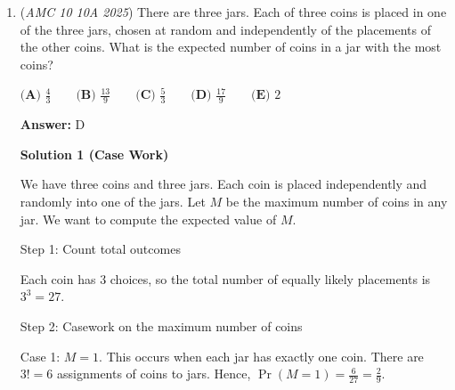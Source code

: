 \begin{enumerate}
 Hence, $t = \frac{40}{50} = \frac{4}{5}$ or $t = \frac{30}{50} = \frac{3}{5}$

 Since $\frac{4}{5}$ and $\frac{3}{5}$ are both valid values for $\cos \theta$ in this case, we need to determine which one to choose.

 We notice that $\theta$ represents the greater angle in $\triangle ABC$, hence, it would correspond to a smaller value of $\cos \theta$ (according to the unit circle). Hence, $\cos \theta = \frac{3}{5}$.

 Plugging the value into the equation $\sin^2 \theta + \cos^2 \theta = 1$:

 
 \[\sin^2 \theta + (\frac{3}{5})^2 = 1\]
 \[\sin^2 \theta + \frac{9}{25} = 1\]
 \[\sin^2 \theta = \frac{16}{25}\]
 \[\sin \theta = \frac{4}{5}\] (It must be positive, because the angle is acute)

 Then, we have:

 
 \[BC = \frac{\cos \theta}{\sin \theta} = \frac{\frac{3}{5}}{\frac{4}{5}} = \frac{3}{5} \cdot \frac{5}{4} = \frac{3}{4}\]

 Hence, $\triangle ABC = \frac{1}{2} \cdot \frac{3}{4} = \boxed{\textbf{(A)} \frac{3}{8}}$.

 


	\item (\textit{AMC 10 10A 2025}) There are three jars. Each of three coins is placed in one of the three jars, chosen at random and independently of the placements of the other coins. What is the expected number of coins in a jar with the most coins?


 $\textbf{(A) } \frac{4}{3} \qquad\textbf{(B) } \frac{13}{9} \qquad\textbf{(C) } \frac{5}{3} \qquad\textbf{(D) } \frac{17}{9} \qquad\textbf{(E) } 2$

 \textbf{Answer: }D



\textbf{Solution 1 (Case Work)}

We have three coins and three jars. Each coin is placed independently and randomly into one of the jars. Let $M$ be the maximum number of coins in any jar. We want to compute the expected value of $M$.

 Step 1: Count total outcomes

 Each coin has $3$ choices, so the total number of equally likely placements is $3^3 = 27$.

 Step 2: Casework on the maximum number of coins

 Case 1:  $M = 1$. This occurs when each jar has exactly one coin. There are $3! = 6$ assignments of coins to jars. Hence, $\Pr(M=1) = \frac{6}{27} = \frac{2}{9}$.


\end{enumerate}
